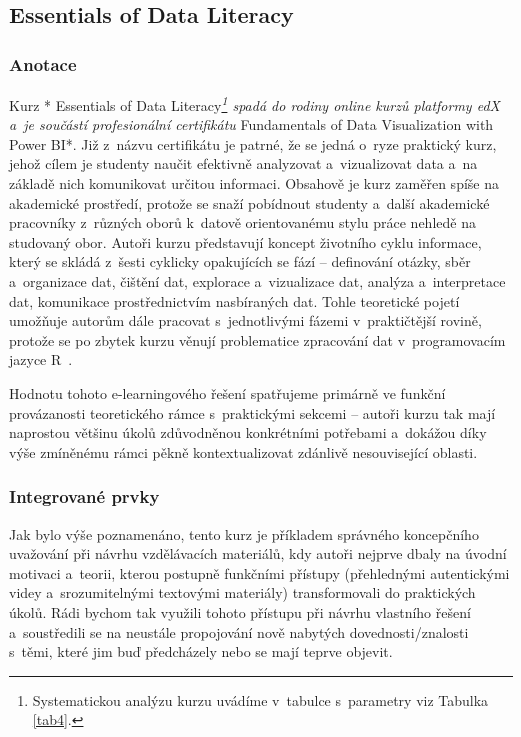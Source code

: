 \hypertarget{essentials-of-data-literacy}{%
\subsection{Essentials of Data Literacy}\label{essentials-of-data-literacy}}

\hypertarget{anotace-3}{%
\subsubsection{Anotace}\label{anotace-3}}

Kurz * Essentials of Data Literacy\emph{\footnote{Systematickou analýzu kurzu uvádíme v~tabulce s~parametry viz Tabulka \ref{tab4}.} spadá do rodiny online kurzů platformy edX a~je součástí profesionální certifikátu }Fundamentals of Data Visualization with Power BI*. Již z~názvu certifikátu je patrné, že se jedná o~ryze praktický kurz, jehož cílem je studenty naučit efektivně analyzovat a~vizualizovat data a~na základě nich komunikovat určitou informaci. Obsahově je kurz zaměřen spíše na akademické prostředí, protože se snaží pobídnout studenty a~další akademické pracovníky z~různých oborů k~datově orientovanému stylu práce nehledě na studovaný obor. Autoři kurzu představují koncept životního cyklu informace, který se skládá z~šesti cyklicky opakujících se fází -- definování otázky, sběr a~organizace dat, čištění dat, explorace a~vizualizace dat, analýza a~interpretace dat, komunikace prostřednictvím nasbíraných dat. Tohle teoretické pojetí umožňuje autorům dále pracovat s~jednotlivými fázemi v~praktičtější rovině, protože se po zbytek kurzu věnují problematice zpracování dat v~programovacím jazyce R~\parencite{course4}.

Hodnotu tohoto e-learningového řešení spatřujeme primárně ve funkční provázanosti teoretického rámce s~praktickými sekcemi -- autoři kurzu tak mají naprostou většinu úkolů zdůvodněnou konkrétními potřebami a~dokážou díky výše zmíněnému rámci pěkně kontextualizovat zdánlivě nesouvisející oblasti.

\hypertarget{integrovanuxe9-prvky-3}{%
\subsubsection{Integrované prvky}\label{integrovanuxe9-prvky-3}}

Jak bylo výše poznamenáno, tento kurz je příkladem správného koncepčního uvažování při návrhu vzdělávacích materiálů, kdy autoři nejprve dbaly na úvodní motivaci a~teorii, kterou postupně funkčními přístupy (přehlednými autentickými videy a~srozumitelnými textovými materiály) transformovali do praktických úkolů. Rádi bychom tak využili tohoto přístupu při návrhu vlastního řešení a~soustředili se na neustále propojování nově nabytých dovednosti/znalosti s~těmi, které jim buď předcházely nebo se mají teprve objevit.
